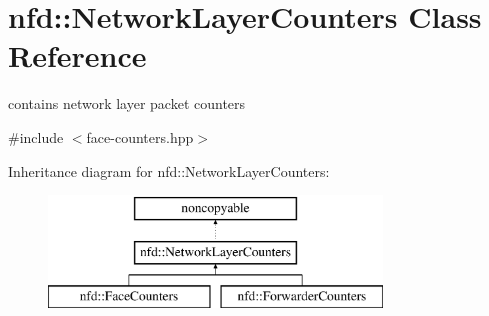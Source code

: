 \hypertarget{classnfd_1_1NetworkLayerCounters}{}\section{nfd\+:\+:Network\+Layer\+Counters Class Reference}
\label{classnfd_1_1NetworkLayerCounters}


contains network layer packet counters  




{\ttfamily \#include $<$face-\/counters.\+hpp$>$}

Inheritance diagram for nfd\+:\+:Network\+Layer\+Counters\+:\begin{figure}[H]
\begin{center}
\leavevmode
\includegraphics[height=3.000000cm]{classnfd_1_1NetworkLayerCounters}
\end{center}
\end{figure}
